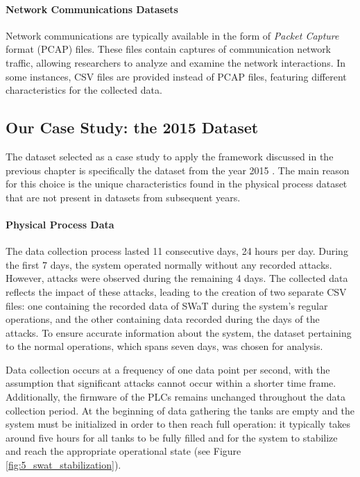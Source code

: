 \paragraph{Network Communications Datasets}
Network communications are typically available in the form of \textit{Packet Capture} format (PCAP) files. These files contain captures of communication network traffic, allowing researchers to analyze and examine the network interactions. In some instances, CSV files are provided instead of PCAP files, featuring different characteristics for the collected data.

\subsection{Our Case Study: the 2015 Dataset}
\label{subsec:5_2015_datasets}
The dataset selected as a case study to apply the framework discussed in the previous chapter is specifically the dataset from the year 2015 \cite{swat_dataset2015}. The main reason for this choice is the unique characteristics found in the physical process dataset that are not present in datasets from subsequent years.

\paragraph{Physical Process Data}
\label{par:5_2015_physical_dataset}
The data collection process lasted 11 consecutive days, 24 hours per day. During the first 7 days, the system operated normally without any recorded attacks. However, attacks were observed during the remaining 4 days. The collected data reflects the impact of these attacks, leading to the creation of two separate CSV files: one containing the recorded data of SWaT during the system's regular operations, and the other containing data recorded during the days of the attacks. To ensure accurate information about the system, the dataset pertaining to the normal operations, which spans seven days, was chosen for analysis.

\bigskip
Data collection occurs at a frequency of one data point per second, with the assumption that significant attacks cannot occur within a shorter time frame. Additionally, the firmware of the PLCs remains unchanged throughout the data collection period.\newline
At the beginning of data gathering the tanks are empty and the system must be initialized in order to then reach full operation: it typically takes around five hours for all tanks to be fully filled and for the system to stabilize and reach the appropriate operational state (see Figure \ref{fig:5_swat_stabilization}).


